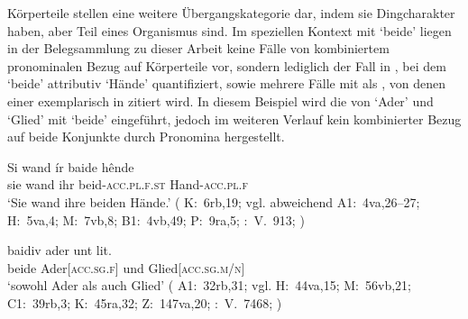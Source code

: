 

Körperteile stellen eine weitere Übergangskategorie dar, indem sie
Dingcharakter haben, aber Teil eines Organismus sind. Im
speziellen Kontext mit  `beide' liegen in der Belegsammlung zu
dieser Arbeit keine Fälle von kombiniertem pronominalen Bezug auf Körperteile
vor, sondern lediglich der Fall in , bei dem 
`beide' attributiv  `Hände' quantifiziert, sowie
mehrere Fälle mit  als , von denen einer
exemplarisch in  zitiert wird. In diesem Beispiel wird
die  von  `Ader' und  `Glied' mit
 `beide' eingeführt, jedoch im weiteren Verlauf kein kombinierter
Bezug auf beide Konjunkte durch Pronomina hergestellt.

\begin{exe}
\ex \begin{xlist}
	\ex \label{ex:bodyparts_attr}
		\gll Si wand ír baide hênde \\
			sie wand ihr beid-\textsc{acc.pl.f.st} Hand-\textsc{acc.pl.f} \\
		\trans `Sie wand ihre beiden Hände.'
			(%
				K:~6rb,19; vgl. abweichend
				A1:~4va,26--27;
				H:~5va,4;
				M:~7vb,8;
				B1:~4vb,49;
				P:~9ra,5;
				\KC:~V.~913; \cite[98]{schroeder1895}%
			)

	\ex \label{ex:bodyparts_conj}
		\gll baidiv ader unt lit. \\
			beide Ader[\textsc{acc.sg.f}] und Glied[\textsc{acc.sg.m/n}] \\
		\trans `sowohl Ader als auch Glied'
			(%
				A1:~32rb,31; vgl.
				H:~44va,15;
				M:~56vb,21;
				C1:~39rb,3;
				K:~45ra,32;
				Z:~147va,20;
				\KC:~V.~7468; \cite[218]{schroeder1895}%
			)
\end{xlist}
\end{exe}

